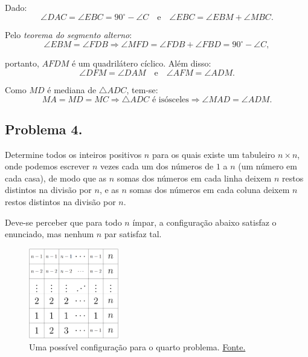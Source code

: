 \documentclass[12pt]{article}
\begin{document}
    Dado:
    \[
      \angle DAC = \angle EBC = 90^\circ - \angle C \quad \text{e} \quad \angle EBC = \angle EBM + \angle MBC.
    \]

    Pelo \textit{teorema do segmento alterno}:
    \[
      \angle EBM = \angle FDB \Rightarrow \angle MFD = \angle FDB + \angle FBD = 90^\circ - \angle C,
    \]

    portanto, \( AFDM \) é um quadrilátero cíclico. Além disso:
    \[
      \angle DFM = \angle DAM \quad \text{e} \quad \angle AFM = \angle ADM.
    \]

    Como \( MD \) é mediana de \( \triangle ADC \), tem-se:
    \[
      MA = MD = MC \Rightarrow \triangle ADC \text{ é isósceles} \Rightarrow \angle MAD = \angle ADM.
    \]

    \clearpage

    \subsection{Problema 4.}
      \begin{tcolorbox}[problembox={Enunciado do problema}]
        Determine todos os inteiros positivos \( n \) para os quais existe um
        tabuleiro \( n \times n \), onde podemos escrever \( n \) vezes cada um dos
        números de \( 1 \) a \( n \) (um número em cada casa), de modo que as \( n \)
        somas dos números em cada linha deixem \( n \) restos distintos na divisão por
        \( n \), e as \( n \) somas dos números em cada coluna deixem \( n \) restos
        distintos na divisão por \( n \).
      \end{tcolorbox}

      Deve-se perceber que para todo $n$ ímpar, a configuração abaixo satisfaz o enunciado,
      mas nenhum $n$ par satisfaz tal.
  
      \begin{figure}[h]
        \centering
        \includegraphics[width=0.35\textwidth]{second.png}
        \caption{Uma possível configuração para o quarto problema. \href{https://noic.com.br/wp-content/uploads/2023/11/Solucoes_da_TM2_Nivel_A.pdf}{Fonte.}}
      \end{figure}
\end{document}
